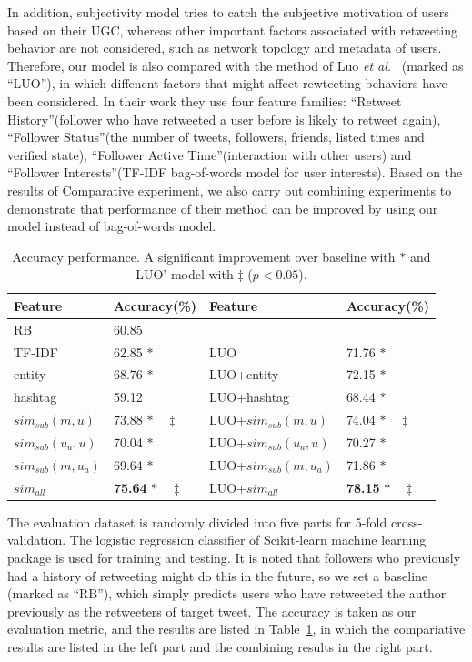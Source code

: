 \documentclass[letterpaper]{article}
\begin{document}
In addition, subjectivity model tries to catch the subjective motivation of users based on their UGC, whereas other important factors associated with retweeting behavior are not considered, such as network topology and metadata of users. 
Therefore, our model is also compared with the method of Luo \emph{et al.}~ (marked as ``LUO''), in which diffenent factors that might affect rewteeting behaviors have been considered.
In their work they use four feature families: ``Retweet History''(follower who have retweeted a user before is likely to retweet again), ``Follower Status''(the number of tweets, followers, friends, listed times and verified state), ``Follower Active Time''(interaction with other users) and ``Follower Interests''(TF-IDF bag-of-words model for user interests). 
Based on the results of Comparative experiment, we also carry out combining experiments to demonstrate that performance of their method can be improved by using our model instead of bag-of-words model. 
\begin{table}[h]
\scriptsize
\centering
\caption{Accuracy performance. A significant improvement over baseline with $ \ast $ and LUO' model with $ \ddagger $ ($p < 0.05$).}
\label{tab3}
\begin{tabular}{|l|l|l|l|}
\hline
Feature & Accuracy(\%) & Feature & Accuracy(\%)\\
\hline
RB & 60.85 & & \\
TF-IDF & 62.85   $\ast$ & LUO & 71.76 $ \ast  $\\
entity & 68.76  $\ast$ & LUO+entity & 72.15 $\ast$\\
hashtag & 59.12  & LUO+hashtag & 68.44 $\ast$\\
$ sim_{sub} \left( m,u \right) $ & 73.88   $\ast  \quad \ddagger $ &LUO+$ sim_{sub} \left( m,u \right)$ & 74.04  $ \ast \quad \ddagger $\\
$ sim_{sub}\left( u_{a},u \right)  $ & 70.04   $\ast  $ & LUO+$ sim_{sub}\left( u_{a},u \right)$ & 70.27  $ \ast $\\
$ sim_{sub}\left( m,u_{a} \right)  $ & 69.64   $\ast  $ & LUO+$ sim_{sub}\left( m,u_{a} \right)$ & 71.86  $ \ast $\\
$ sim_{all}  $ & \textbf{75.64}   $\ast \quad \ddagger $ & LUO+$ sim_{all}  $ & \textbf{78.15}  $ \ast \quad \ddagger $\\
\hline
\end{tabular}
\end{table}

The evaluation dataset is randomly divided into five parts for 5-fold cross-validation. 
The logistic regression classifier of Scikit-learn machine learning package \cite{scikit-learn} is used for training and testing.
It is noted that followers who previously had a history of retweeting might do this in the future, so we set a baseline (marked as ``RB''), which simply predicts users who have retweeted the author previously as the retweeters of target tweet. 
The accuracy is taken as our evaluation metric, and the results are listed in Table~\ref{tab3}, in which the compariative results are listed in the left part and the combining results in the right part.
\end{document}
